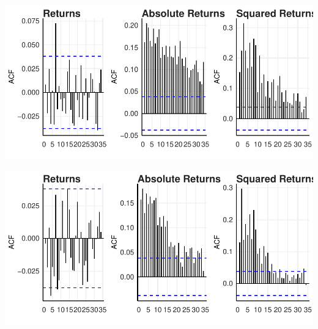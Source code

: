 \documentclass[11pt,preprint, authoryear]{elsarticle}
\let\origfigure\figure
\let\endorigfigure\endfigure
\renewenvironment{figure}[1][2] {
    \expandafter\origfigure\expandafter[H]
} {
    \endorigfigure
}
\numberwithin{equation}{section}
\numberwithin{figure}{section}
\numberwithin{table}{section}
\begin{document}
\begin{figure}[H]

{\centering \includegraphics{WriteUp_files/figure-latex/FigureA5-1} 

}

\caption{Autocorrelation Functions: Resources \label{FigureA5}}\label{fig:FigureA5}
\end{figure}

\begin{figure}[H]

{\centering \includegraphics{WriteUp_files/figure-latex/FigureA6-1} 

}

\caption{Autocorrelation Functions: Industrials \label{FigureA6}}\label{fig:FigureA6}
\end{figure}


\end{document}
